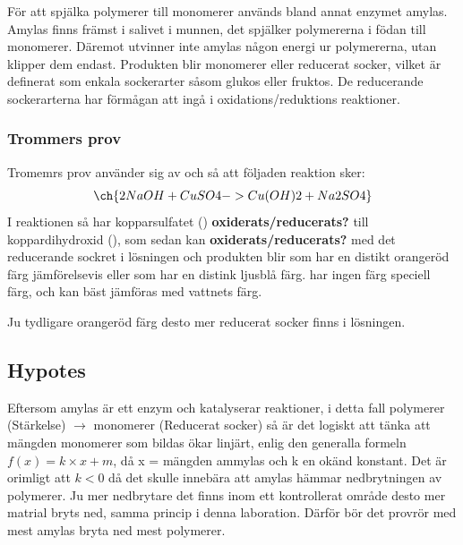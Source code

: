 \documentclass[a4paper,12pt]{article}
\begin{document}
	För att spjälka polymerer till monomerer används bland annat enzymet amylas. Amylas finns främst i salivet i munnen, det spjälker polymererna i födan till monomerer. Däremot utvinner inte amylas någon energi ur polymererna, utan klipper dem endast. Produkten blir monomerer eller reducerat socker, vilket är definerat som enkala sockerarter såsom glukos eller fruktos. De reducerande sockerarterna har förmågan att ingå i oxidations/reduktions reaktioner. 

\subsubsection{Trommers prov}

	Tromemrs prov använder sig av  och  så att följaden reaktion sker: 
	\begin{equation}
		\ch{2 NaOH + CuSO4  -> Cu(OH)2 + Na2SO4}
	\end{equation}
	I reaktionen så har kopparsulfatet () \textbf{oxiderats/reducerats?} till koppardihydroxid (), som sedan kan \textbf{oxiderats/reducerats?} med det reducerande sockret i lösningen och produkten blir  som har en distikt orangeröd färg jämförelsevis  eller  som har en distink ljusblå färg.  har ingen färg speciell färg, och kan bäst jämföras med vattnets färg. 

	Ju tydligare orangeröd färg desto mer reducerat socker finns i lösningen.

	
	



\subsection{Hypotes}

	Eftersom amylas är ett enzym och katalyserar reaktioner, i detta fall polymerer (Stärkelse) $\rightarrow$ monomerer (Reducerat socker) så är det logiskt att tänka att mängden monomerer som bildas ökar linjärt, enlig den generalla formeln $f(x) = k \times x + m$, då x = mängden ammylas och k en okänd konstant. Det är orimligt att $k < 0$ då det skulle innebära att amylas hämmar nedbrytningen av polymerer. Ju mer nedbrytare det finns inom ett kontrollerat område desto mer matrial bryts ned, samma princip i denna laboration. Därför bör det provrör med mest amylas bryta ned mest polymerer.
\end{document}
